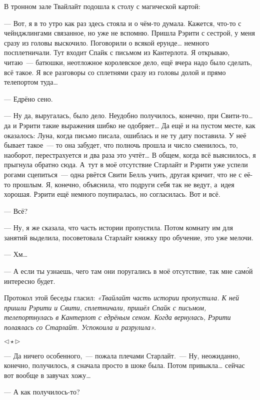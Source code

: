 \documentclass[fontsize=11pt,a5paper,titlepage=firstcover]{scrbook}
\begin{document}
В тронном зале Твайлайт подошла к столу с магической картой:

--- Вот, я в то утро как раз здесь стояла и о чём-то думала. Кажется, что-то с чейнджлингами связанное, но уже не вспомню. Пришла Рэрити с сестрой, у меня сразу из головы выскочило. Поговорили о всякой ерунде{\ldots} немного посплетничали. Тут входит Спайк с письмом из Кантерлота. Я открываю, читаю~--- батюшки, неотложное королевское дело, ещё вчера надо было сделать, всё такое. Я все разговоры со сплетнями сразу из головы долой и прямо телепортом туда{\ldots}

--- Едрёно сено.

--- Ну да, выругалась, было дело. Неудобно получилось, конечно, при Свити-то{\ldots} да и Рэрити такие выражения шибко не одобряет{\ldots} Да ещё и на пустом месте, как оказалось: Луна, когда письмо писала, ошиблась и не ту дату поставила. У неё бывает такое~--- то она забудет, что полночь прошла и число сменилось, то, наоборот, перестрахуется и два раза это учтёт{\ldots} В общем, когда всё выяснилось, я прыгнула обратно сюда. А~тут в моё отсутствие Старлайт и Рэрити уже успели рогами сцепиться~--- одна рвётся Свити Белль учить, другая кричит, что не с её-то прошлым. Я, конечно, объяснила, что подруги себя так не ведут, а~идея хорошая. Рэрити ещё немного поупиралась, но согласилась. Вот и всё.

--- Всё?

--- Ну, я же сказала, что часть истории пропустила. Потом комнату им для занятий выделила, посоветовала Старлайт книжку про обучение, это уже мелочи.

--- Хм{\ldots}

--- А если ты узнаешь, чего там они поругались в моё отсутствие, так мне само́й интересно будет.

Протокол этой беседы гласил: \emph{«Твайлайт часть истории пропустила. К ней пришли Рэрити и Свити, сплетничали, пришёл Спайк с письмом, телепортнулась в Кантерлот с едрёным сеном. Когда вернулась, Рэрити полаялась со Старлайт. Успокоила и разрулила».}

\begin{center}$\triangleleft\star\triangleright$\end{center}

--- Да ничего особенного,~--- пожала плечами Старлайт.~--- Ну, неожиданно, конечно, получилось, я сначала просто в шоке была. Потом привыкла{\ldots} сейчас вот вообще в завучах хожу{\ldots}

--- А как получилось-то?
\end{document}
